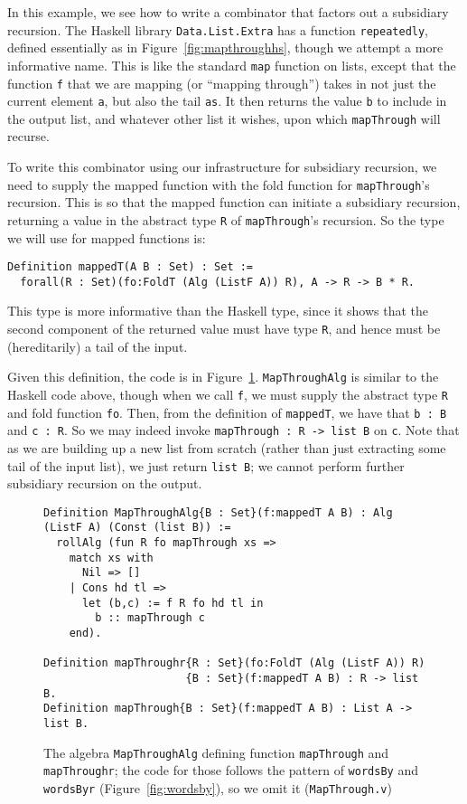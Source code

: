 \documentclass[a4paper,USenglish]{lipics-v2021}
\begin{document}
In this example, we see how to write a combinator that factors out a
subsidiary recursion.  The Haskell library \verb|Data.List.Extra| has
a function \verb|repeatedly|, defined essentially as in
Figure~\ref{fig:mapthroughhs}, though we attempt a more informative
name.  This is like the standard \verb|map| function on lists, except
that the function \verb|f| that we are mapping (or ``mapping
through'') takes in not just the current element \verb|a|, but also
the tail \verb|as|.  It then returns the value \verb|b| to include in
the output list, and whatever other list it wishes, upon which
\verb|mapThrough| will recurse.

To write this combinator using our infrastructure for subsidiary
recursion, we need to supply the mapped function with the fold
function for \verb|mapThrough|'s recursion.  This is so that the
mapped function can initiate a subsidiary recursion, returning a value
in the abstract type \verb|R| of \verb|mapThrough|'s recursion.  So
the type we will use for mapped functions is:
\begin{verbatim}
Definition mappedT(A B : Set) : Set :=
  forall(R : Set)(fo:FoldT (Alg (ListF A)) R), A -> R -> B * R.
\end{verbatim}
\noindent This type is more informative than the Haskell type,
since it shows that the second component of the returned value
must have type \verb|R|, and hence must be (hereditarily) a tail
of the input.

Given this definition, the code is in Figure~\ref{fig:mapthrough}.  
\verb|MapThroughAlg| is similar to the
Haskell code above, though when we call \verb|f|, we must
supply the abstract type \verb|R| and fold function \verb|fo|.  Then,
from the definition of \verb|mappedT|, we have that \verb|b : B| and
\verb|c : R|.  So we may indeed invoke \verb|mapThrough : R -> list B|
on \verb|c|.  Note that as we are building up a new list from scratch
(rather than just extracting some tail of the input list), we just
return \verb|list B|; we cannot perform further subsidiary recursion
on the output.  

\begin{figure}
\begin{verbatim}
Definition MapThroughAlg{B : Set}(f:mappedT A B) : Alg (ListF A) (Const (list B)) :=
  rollAlg (fun R fo mapThrough xs => 
    match xs with
      Nil => []
    | Cons hd tl =>
      let (b,c) := f R fo hd tl in
        b :: mapThrough c
    end).

Definition mapThroughr{R : Set}(fo:FoldT (Alg (ListF A)) R)
                      {B : Set}(f:mappedT A B) : R -> list B.
Definition mapThrough{B : Set}(f:mappedT A B) : List A -> list B.
\end{verbatim}
\caption{The algebra \texttt{MapThroughAlg} defining function \texttt{mapThrough} and \texttt{mapThroughr}; the
  code for those follows the pattern of \texttt{wordsBy} and \texttt{wordsByr} (Figure~\ref{fig:wordsby}), so
  we omit it (\texttt{MapThrough.v})}
\label{fig:mapthrough}
\end{figure}
\end{document}
